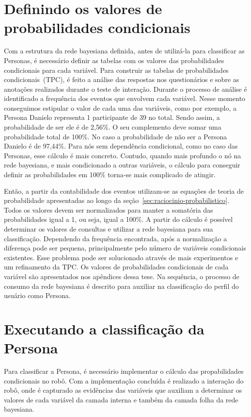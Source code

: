 \section{Definindo os valores de probabilidades condicionais}
\label{sec:tpc}
Com a estrutura da rede bayesiana definida, antes de utilizá-la para classificar as Personas, é necessário definir as tabelas com os valores das probabilidades condicionais para cada variável. Para construir as tabelas de probabilidades condicionais~(TPC), é feito a análise das respostas nos questionários e sobre as anotações realizados durante o teste de interação. Durante o processo de análise é identificado a frequência dos eventos que envolvem cada variável. Nesse momento conseguimos estipular o valor de cada uma das variáveis, como por exemplo, a Persona Danielo representa 1 participante de 39 no total. Sendo assim, a probabilidade de ser ele é de 2,56\%. O seu complemento deve somar uma probabilidade total de 100\%. No caso a probabilidade de não ser a Persona Danielo é de 97,44\%. Para nós sem dependência condicional, como no caso das Personas, esse cálculo é mais concreto. Contudo, quando mais profundo o nó na rede bayesiana, e mais condicionado a outras variáveis, o cálculo para conseguir definir as probabilidades em 100\% torna-se mais complicado de atingir.

 Então, a partir da contabilidade dos eventos utilizam-se as equações de teoria de probabilidade apresentadas ao longo da seção~\ref{sec:raciocinio-probabilistico}. Todos os valores devem ser normalizados para manter a somatória das probabilidades igual a 1, ou seja, igual a 100\%. A partir do cálculo é possível determinar os valores de consultas e utilizar a rede bayesiana para sua classificação. Dependendo da frequência encontrada, após a normalização a diferença pode ser pequena, principalmente pelo número de variáveis condicionais existentes. Esse problema pode ser solucionado através de mais experimentos e um refinamento da TPC. Os valores de probabilidades condicionais de cada variável são apresentados nos apêndices dessa tese. Na sequência, o processo de consumo da rede bayesiana é descrito para auxiliar na classificação do perfil do usuário como Persona.

\section{Executando a classificação da Persona}
\label{sec:consumo}
Para classificar a Persona, é necessário implementar o cálculo das propabilidades condicionais no robô. Com a implementação concluída é realizado a interação do robô, onde é capturado as evidências das variáveis que auxiliam a determinar os valores de cada variável da camada interna e também da camada folha da rede bayesiana.

